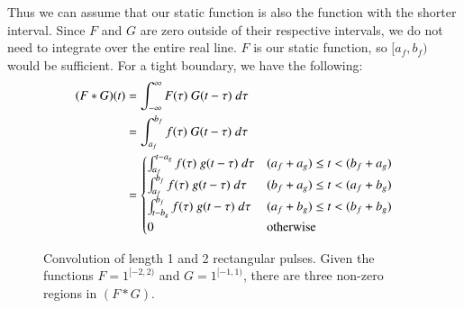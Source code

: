 Thus we can assume that our static function is also the function with the shorter interval.
Since $F$ and $G$ are zero outside of their respective intervals, we do not need to integrate over the entire real line. 
$F$ is our static function, so $[a_f, b_f)$ would be sufficient.
For a tight boundary, we have the following:
\begin{align}
	\label{eqn:ConvNaiveOnePiece}
	(F*G)(t) 
	&= \int_{-\infty}^\infty F(\tau)\; G(t-\tau) \; d\tau \notag \\
	&= \int_{a_f}^{b_f} f(\tau) \; G(t-\tau) \; d\tau \notag \\
	&= 	\begin{cases}
			\int_{a_f}^{t-a_g} f(\tau) \; g(t-\tau) \; d\tau 	& (a_f+a_g) \leq t < (b_f+a_g) \\
			\int_{a_f}^{b_f} f(\tau) \; g(t-\tau) \; d\tau		& (b_f+a_g) \leq t < (a_f+b_g) \\
			\int_{t-b_g}^{b_f} f(\tau) \; g(t-\tau) \; d\tau	& (a_f+b_g) \leq t < (b_f+b_g) \\
			0										& \text{otherwise}
		\end{cases}
\end{align}


\begin{figure}[ht]
	\caption[Convolution of ``one-piece'' functions]{Convolution of length 1 and 2 rectangular pulses. 
	Given the functions $F=1^{[-2,2)}$ and $G=1^{[-1,1)}$, there are three non-zero regions in $(F*G)$.
	\label{fig:OnePiece}}
	\centering
\end{figure}


